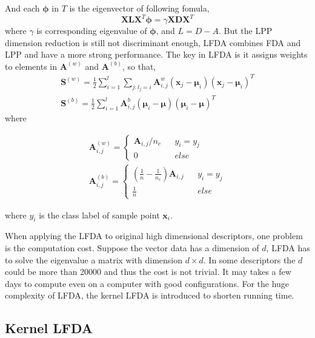\documentclass[conference,compsoc]{IEEEtran}
\begin{document}
And each $\bm{\phi}$ in $T$ is the eigenvector of following fomula,
 \begin{equation}
\bm{X}\bm{L}\bm{X}^T\bm{\phi} = \gamma\bm{X}\bm{D}\bm{X}^T
\end{equation}
where $\gamma$ is corresponding eigenvalue of $\bm{\phi}$, and $L = D - A$.
But the LPP dimension reduction is still not discriminant enough, LFDA combines FDA and LPP and have a more strong performance. The key in LFDA is it assigns weights to elements in $\bm{A}^{(w)}$ and $\bm{A}^{(b)}$, so that,
\begin{equation}
\begin{aligned}
\bm{S}^{(w)} = \frac{1}{2}\sum _{i=1}^l\sum_{j:l_j = i} \bm{A}_{i,j}^w (\bm{x}_j - \bm{\mu}_i)(\bm{x}_j - \bm{\mu}_i)^T \\
\bm{S}^{(b)} =  \frac{1}{2}\sum _{i=1}^l \bm{A}_{i,j}^b(\bm{\mu}_i - \bm{\mu})(\bm{\mu}_i - \bm{\mu})^T
\end{aligned}
\end{equation}
where 

\begin{equation}
\begin{aligned}
\bm{A}_{i,j}^{(w)} = \left \{ 
\begin{array}{rcl}
\bm{A}_{i,j}/n_c &  &y_i = y_j \\
0 & & else
\end{array}
  \right.  \\
  \bm{A}_{i,j}^{(b)} = \left \{ 
\begin{array}{rcl}
(\frac{1}{n} - \frac{1}{n_c})  \bm{A}_{i,j} &  &{y_i = y_j }\\
\frac{1}{n} & & {else}
\end{array}
  \right. 
 \end{aligned}
\end{equation}
  
  where $y_i$ is the class label of sample point $\bm{x}_i$.
  
When applying the LFDA to original high dimensional descriptors, one problem is the computation cost. Suppose the vector data has a dimension of $d$, LFDA has to solve the eigenvalue a matrix with dimension $d\times d$. In some descriptors the $d$ could be more than 20000 and thus the cost is not trivial. It may takes a few days to compute even on a computer with good configurations. For the huge complexity of LFDA, the kernel LFDA is introduced to shorten running time. 
 
 \subsection{Kernel LFDA}
 
\end{document}
